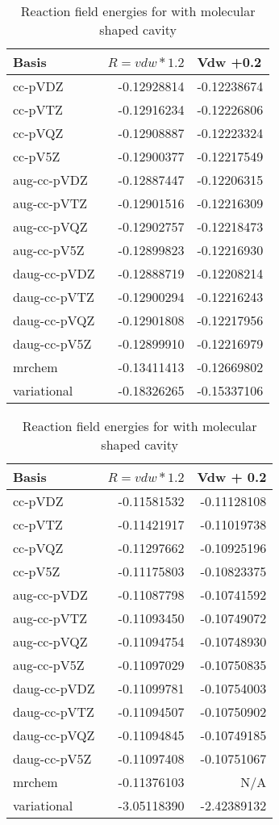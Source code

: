 \documentclass[../Thesis.tex]{subfiles}
\begin{document}
\begin{table}[htbp]
\caption{Reaction field  energies for  with molecular shaped cavity}
\begin{tabular}{l|r|r}
Basis & \multicolumn{1}{l|}{$R = vdw*1.2$} & \multicolumn{1}{l|}{Vdw +0.2} \\ \hline
cc-pVDZ & -0.12928814 & -0.12238674 \\
cc-pVTZ & -0.12916234 & -0.12226806 \\
cc-pVQZ & -0.12908887 & -0.12223324 \\
cc-pV5Z & -0.12900377 & -0.12217549 \\ \hline
aug-cc-pVDZ & -0.12887447 & -0.12206315 \\
aug-cc-pVTZ & -0.12901516 & -0.12216309 \\
aug-cc-pVQZ & -0.12902757 & -0.12218473 \\
aug-cc-pV5Z & -0.12899823 & -0.12216930 \\ \hline
daug-cc-pVDZ & -0.12888719 & -0.12208214 \\
daug-cc-pVTZ & -0.12900294 & -0.12216243 \\
daug-cc-pVQZ & -0.12901808 & -0.12217956 \\
daug-cc-pV5Z & -0.12899910 & -0.12216979 \\ \hline
mrchem & -0.13411413 & -0.12669802 \\
variational & -0.18326265 & -0.15337106 \\
\end{tabular}
\label{tab:abcErnop}
\end{table}

\begin{table}[htbp]
\caption{Reaction field  energies for  with molecular shaped cavity}
\begin{tabular}{l|r|r}
Basis & \multicolumn{1}{l|}{$R = vdw*1.2$} & \multicolumn{1}{l|}{Vdw + 0.2} \\ \hline
cc-pVDZ & -0.11581532 & -0.11128108 \\
cc-pVTZ & -0.11421917 & -0.11019738 \\
cc-pVQZ & -0.11297662 & -0.10925196 \\
cc-pV5Z & -0.11175803 & -0.10823375 \\ \hline
aug-cc-pVDZ & -0.11087798 & -0.10741592 \\
aug-cc-pVTZ & -0.11093450 & -0.10749072 \\
aug-cc-pVQZ & -0.11094754 & -0.10748930 \\
aug-cc-pV5Z & -0.11097029 & -0.10750835 \\ \hline
daug-cc-pVDZ & -0.11099781 & -0.10754003 \\
daug-cc-pVTZ & -0.11094507 & -0.10750902 \\
daug-cc-pVQZ & -0.11094845 & -0.10749185 \\
daug-cc-pV5Z & -0.11097408 & -0.10751067 \\ \hline
mrchem & -0.11376103 & N/A \\
variational & -3.05118390 & -2.42389132 \\
\end{tabular}
\label{tab:abcErcyan}
\end{table}
\end{document}
